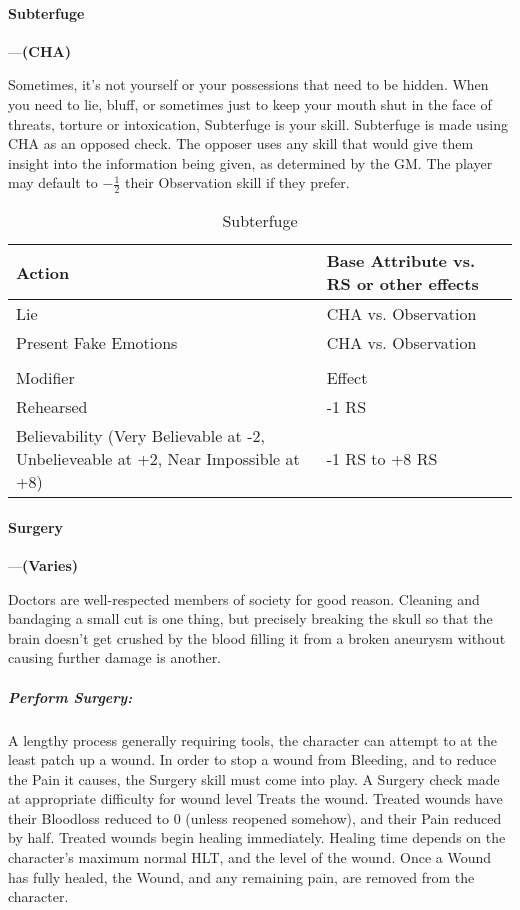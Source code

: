 \documentclass[oneside,11pt,english]{book}
\begin{document}
\paragraph{\label{skill:Subterfuge}Subterfuge}---\quad\textbf{(CHA)}\par
Sometimes, it’s not yourself or your possessions that need to be hidden. When you need to lie, bluff, or sometimes just to keep your mouth shut in the face of threats, torture or intoxication, Subterfuge is your skill. Subterfuge is made using CHA as an opposed check. The opposer uses any skill that would give them insight into the information being given, as determined by the GM. The player may default to $ -\frac{1}{2} $ their Observation skill if they prefer.

\begin{longtabu} to \linewidth{X[1.5]X[r]}
	\caption{Subterfuge}
	\label{tab:Subterfuge}\\
	\rowfont[c]{}Action &Base Attribute vs. RS or other effects\\\toprule
Lie &CHA vs. Observation\\
Present Fake Emotions &CHA vs. Observation \\
\\
	\rowfont[c]{}Modifier&Effect\\\cmidrule(lr){1-2}
Rehearsed &-1 RS \\
Believability (Very Believable at -2, Unbelieveable at +2, Near Impossible at +8) &-1 RS to +8 RS \\
\end{longtabu}

\paragraph{\label{skill:Surgery}Surgery}---\quad\textbf{(Varies)}\par
Doctors are well-respected members of society for good reason. Cleaning and bandaging a small cut is one thing, but precisely breaking the skull so that the brain doesn't get crushed by the blood filling it from a broken aneurysm without causing further damage is another.


\subparagraph{Perform Surgery:} A lengthy process generally requiring tools, the character can attempt to at the least patch up a wound. In order to stop a wound from Bleeding, and to reduce the Pain it causes, the Surgery skill must come into play. A Surgery check made at appropriate difficulty for wound level Treats the wound. Treated wounds have their Bloodloss reduced to 0 (unless reopened somehow), and their Pain reduced by half. Treated wounds begin healing immediately. Healing time depends on the character’s maximum normal HLT, and the level of the wound. Once a Wound has fully healed, the Wound, and any remaining pain, are removed from the character.\par
\end{document}
